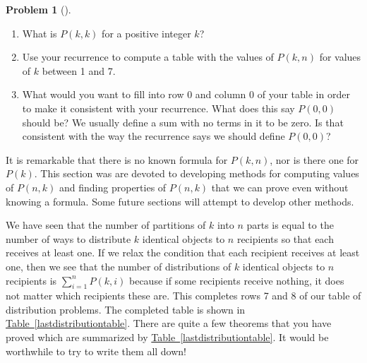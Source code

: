 \documentclass[10pt,]{book}
\theoremstyle{plain}
\theoremstyle{definition}
\newtheorem{activity}[project]{Problem}
\theoremstyle{definition}
\numberwithin{equation}{chapter}
\begin{document}
\begin{activity}[]
\begin{enumerate}[font=\bfseries,label=(\alph*),ref=\alph*]
\item\label{task-128} \marginsymbol[-2.5em]{} What is \(P(k,k)\) for a positive integer \(k\)?%
\item\label{task-129} \marginsymbol[-2.5em]{} Use your recurrence to compute a table with the values of \(P(k,n)\) for values of \(k\) between 1 and 7.%
\item\label{task-130} \marginsymbol[-2.5em]{} What would you want to fill into row 0 and column 0 of your table in order to make it consistent with your recurrence.  What does this say \(P(0,0)\) should be?  We usually define a sum with no terms in it to be zero. Is that consistent with the way the recurrence says we should define \(P(0,0)\)?%
\end{enumerate}
\end{activity}
It is remarkable that there is no known formula for \(P(k,n)\), nor is there one for \(P(k)\). This section was are devoted to developing methods for computing values of \(P(n,k)\) and finding properties of \(P(n,k)\) that we can prove even without knowing a formula. Some future sections will attempt to develop other methods.%
\par
We have seen that the number of partitions of \(k\) into \(n\) parts is equal to the number of ways to distribute \(k\) identical objects to \(n\) recipients so that each receives at least one. If we relax the condition that each recipient receives at least one, then we see that the number of distributions of \(k\) identical objects to \(n\) recipients is \(\sum_{i=1}^n P(k,i)\) because if some recipients receive nothing, it does not matter which recipients these are. This completes rows 7 and 8 of our table of distribution problems. The completed table is shown in \hyperref[lastdistributiontable]{Table~\ref{lastdistributiontable}}. There are quite a few theorems that you have proved which are summarized by \hyperref[lastdistributiontable]{Table~\ref{lastdistributiontable}}.  It would be worthwhile to try to write them all down!%
\end{document}
